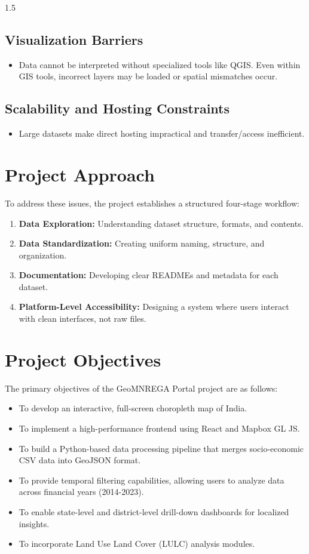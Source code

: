 \documentclass[12pt,a4paper]{report}
\begin{document}
\begin{spacing}{1.5}
\subsection{Visualization Barriers}
\begin{itemize}
    \item Data cannot be interpreted without specialized tools like QGIS. Even within GIS tools, incorrect layers may be loaded or spatial mismatches occur.
\end{itemize}

\subsection{Scalability and Hosting Constraints}
\begin{itemize}
    \item Large datasets make direct hosting impractical and transfer/access inefficient.
\end{itemize}

\section{Project Approach}
To address these issues, the project establishes a structured four-stage workflow:
\begin{enumerate}
    \item \textbf{Data Exploration:} Understanding dataset structure, formats, and contents.
    \item \textbf{Data Standardization:} Creating uniform naming, structure, and organization.
    \item \textbf{Documentation:} Developing clear READMEs and metadata for each dataset.
    \item \textbf{Platform-Level Accessibility:} Designing a system where users interact with clean interfaces, not raw files.
\end{enumerate}

\section{Project Objectives}
The primary objectives of the GeoMNREGA Portal project are as follows:
\begin{itemize}
    \item To develop an interactive, full-screen choropleth map of India.
    \item To implement a high-performance frontend using React and Mapbox GL JS.
    \item To build a Python-based data processing pipeline that merges socio-economic CSV data into GeoJSON format.
    \item To provide temporal filtering capabilities, allowing users to analyze data across financial years (2014-2023).
    \item To enable state-level and district-level drill-down dashboards for localized insights.
    \item To incorporate Land Use Land Cover (LULC) analysis modules.
\end{itemize}


\end{spacing}
\end{document}
